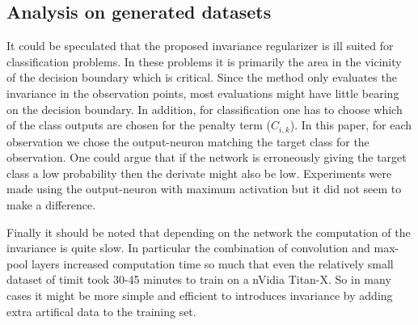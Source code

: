 \subsection{Analysis on generated datasets}
It could be speculated that the proposed invariance regularizer is ill suited for classification problems. In these problems it is primarily the area in the vicinity of the decision boundary which is critical. Since the method only evaluates the invariance in the observation points, most evaluations might have little bearing on the decision boundary. In addition, for classification one has to choose which of the class outputs are chosen for the penalty term ($C_{i,k}$). In this paper, for each observation we chose the output-neuron matching the target class for the observation. One could argue that if the network is erroneously giving the target class a low probability then the derivate might also be low. Experiments were made using the output-neuron with maximum activation but it did not seem to make a difference.

Finally it should be noted that depending on the network the computation of the invariance is quite slow. In particular the combination of convolution and max-pool layers increased computation time so much that even the relatively small dataset of timit took 30-45 minutes to train on a nVidia Titan-X. So in many cases it might be more simple and efficient to introduces invariance by adding extra artifical data to the training set.
